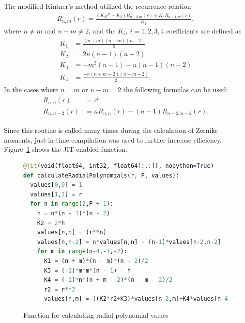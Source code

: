 The modified Kintner's method utilized the recurrence relation
\begin{gather*}
    R_{n,m}(r) =  \frac{(K_2r^2 + K_3)R_{n-2,m}(r) + K_4R_{n-4,m}(r)}{K_1},
\end{gather*}
where $n \neq m$ and $n - m \neq 2$, and the $K_i, \ i = 1,2,3,4$ coefficients are defined as
\begin{gather*}
    \begin{split}
        K_1 &= \frac{(n + m)(n - m)(n - 2)}{2}\\
        K_2 &= 2n(n-1)(n-2)\\
        K_3 &= -m^2(n-1)-n(n-1)(n-2)\\
        K_4 &= \frac{-n(n + m - 2)(n - m - 2)}{2}.
    \end{split}
\end{gather*}
In the cases where $n = m$ or $ n - m = 2$ the following formulas can be used:
\begin{gather*}
    \begin{split}
        R_{n,n}(r) &= r^n\\
        R_{n,n - 2}(r) &= nR_{n,n}(r) - (n - 1)R_{n-2,n-2}(r).
    \end{split}
\end{gather*}


Since this routine is called many times during the calculation of Zernike moments, just-in-time compilation was used to further increase efficiency. Figure~\ref{fig:radial_code} shows the JIT-enabled function.

\begin{figure}[tbp]
    \centering
    \begin{lstlisting}[language=Python]
@jit(void(float64, int32, float64[:,:]), nopython=True)
def calculateRadialPolynomials(r, P, values):
  values[0,0] = 1
  values[1,1] = r
  for n in range(2,P + 1):
    h = n*(n - 1)*(n - 2)
    K2 = 2*h
    values[n,n] = (r**n)
    values[n,n-2] = n*values[n,n] - (n-1)*values[n-2,n-2]
    for m in range(n-4,-1,-2):			
      K1 = (n + m)*(n - m)*(n - 2)/2
      K3 = (-1)*m*m*(n - 1) - h
      K4 = (-1)*n*(n + m - 2)*(n - m - 2)/2
      r2 = r**2
      values[n,m] = ((K2*r2+K3)*values[n-2,m]+K4*values[n-4,m])/K1\end{lstlisting}
    \caption{Function for calculating radial polynomial values}
    \label{fig:radial_code}
\end{figure}

